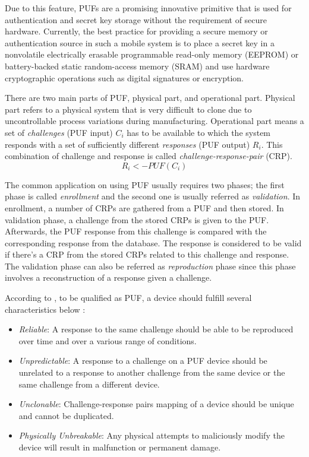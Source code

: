 Due to this feature, PUFs are a promising innovative primitive that is used for authentication and secret key storage without the requirement of secure hardware. Currently, the best practice for providing a secure memory or authentication source in such a mobile system is to place a secret key in a nonvolatile electrically erasable programmable read-only memory (EEPROM) or battery-backed static random-access memory (SRAM) and use hardware cryptographic operations such as digital signatures or encryption.

There are two main parts of PUF, physical part, and operational part. Physical part refers to a physical system that is very difficult to clone due to uncontrollable process variations during manufacturing. Operational part means a set of \textit{challenges} (PUF input) $C_i$ has to be available to which the system responds with a set of sufficiently different \textit{responses} (PUF output) $R_i$. This combination of challenge and response is called \textit{challenge-response-pair} (CRP).
\begin{equation}
R_i <- PUF(C_i)
\end{equation}

The common application on using PUF usually requires two phases; the first phase is called \textit{enrollment} and the second one is usually referred as \textit{validation}. In enrollment, a number of CRPs are gathered from a PUF and then stored. In validation phase, a challenge from the stored CRPs is given to the PUF. Afterwards, the PUF response from this challenge is compared with the corresponding response from the database. The response is considered to be valid if there's a CRP from the stored CRPs related to this challenge and response. The validation phase can also be referred as \textit{reproduction} phase since this phase involves a reconstruction of a response given a challenge.

According to \cite{retrospective}, to be qualified as PUF, a device should fulfill several characteristics below :
\begin{itemize}
\item \textit{Reliable}: A response to the same challenge should be able to be reproduced over time and over a various range of conditions.
\item \textit{Unpredictable}: A response to a challenge on a PUF device should be unrelated to a response to another challenge from the same device or the same challenge from a different device.
\item \textit{Unclonable}: Challenge-response pairs mapping of a device should be unique and cannot be duplicated.
\item \textit{Physically Unbreakable}: Any physical attempts to maliciously modify the device will result in malfunction or permanent damage.
\end{itemize}


